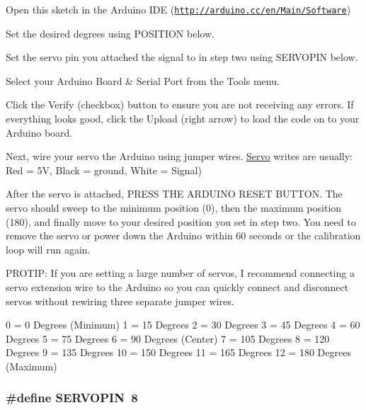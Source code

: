 \begin{DoxyEnumerate}
\item Open this sketch in the Arduino I\-D\-E (\href{http://arduino.cc/en/Main/Software}{\tt http\-://arduino.\-cc/en/\-Main/\-Software})
\item Set the desired degrees using P\-O\-S\-I\-T\-I\-O\-N below.
\item Set the servo pin you attached the signal to in step two using S\-E\-R\-V\-O\-P\-I\-N below.
\item Select your Arduino Board \& Serial Port from the Tools menu.
\item Click the Verify (checkbox) button to ensure you are not receiving any errors. If everything looks good, click the Upload (right arrow) to load the code on to your Arduino board.
\item Next, wire your servo the Arduino using jumper wires. \hyperlink{class_servo}{Servo} writes are usually\-: Red = 5\-V, Black = ground, White = Signal)
\item After the servo is attached, P\-R\-E\-S\-S T\-H\-E A\-R\-D\-U\-I\-N\-O R\-E\-S\-E\-T B\-U\-T\-T\-O\-N. The servo should sweep to the minimum position (0), then the maximum position (180), and finally move to your desired position you set in step two. You need to remove the servo or power down the Arduino within 60 seconds or the calibration loop will run again.
\end{DoxyEnumerate}

P\-R\-O\-T\-I\-P\-: If you are setting a large number of servos, I recommend connecting a servo extension wire to the Arduino so you can quickly connect and disconnect servos without rewiring three separate jumper wires.

0 = 0 Degrees (Minimum) 1 = 15 Degrees 2 = 30 Degrees 3 = 45 Degrees 4 = 60 Degrees 5 = 75 Degrees 6 = 90 Degrees (Center) 7 = 105 Degrees 8 = 120 Degrees 9 = 135 Degrees 10 = 150 Degrees 11 = 165 Degrees 12 = 180 Degrees (Maximum) \hypertarget{_servo_set_position_8ino_a64a5788920049543903e587c2ca9db7d}{
\subsubsection[{S\-E\-R\-V\-O\-P\-I\-N}]{\setlength{\rightskip}{0pt plus 5cm}\#define S\-E\-R\-V\-O\-P\-I\-N~8}}\label{_servo_set_position_8ino_a64a5788920049543903e587c2ca9db7d}


